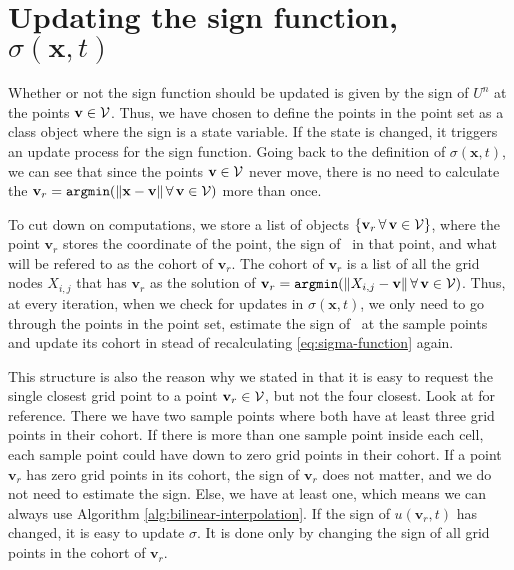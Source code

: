 \section{Updating the sign function, \texorpdfstring{$\sigma (\mathbf{x}, t)$}{sigma}} \label{sec:data-struc}
Whether or not the sign function should be updated is given by the sign of $U^n$ at the points $\mathbf{v}\in\mathcal{V}$. Thus, we have chosen to define the points in the point set as a class object where the sign is a state variable. If the state is changed, it triggers an update process for the sign function. Going back to the definition of $\sigma(\mathbf{x}, t)$, we can see that since the points $\mathbf{v}\in\mathcal{V}$ never move, there is no need to calculate the $\mathbf{v}_r = \texttt{argmin}(\|\mathbf{x}-\mathbf{v}\| \, \forall \, \mathbf{v} \in \mathcal{V})$ more than once. 

To cut down on computations, we store a list of objects $\{\mathbf{v}_r \, \forall \, \mathbf{v} \in \mathcal{V}\}$, where the point $\mathbf{v}_r$ stores the coordinate of the point, the sign of \uxt\ in that point, and what will be refered to as the cohort of $\mathbf{v}_r$. The cohort of $\mathbf{v}_r$ is a list of all the grid nodes $X_{i, j}$ that has $\mathbf{v}_r$ as the solution of $\mathbf{v}_r = \texttt{argmin}(\|X_{i, j}-\mathbf{v}\| \, \forall \, \mathbf{v} \in \mathcal{V})$. Thus, at every iteration, when we check for updates in $\sigma(\mathbf{x}, t)$, we only need to go through the points in the point set, estimate the sign of \uxt\ at the sample points and update its cohort in stead of recalculating \eqref{eq:sigma-function} again.

This structure is also the reason why we stated in  that it is easy to request the single closest grid point to a point $\mathbf{v}_r \in \mathcal{V}$, but not the four closest. Look at  for reference. There we have two sample points where both have at least three grid points in their cohort. If there is more than one sample point inside each cell, each sample point could have down to zero grid points in their cohort. If a point $\mathbf{v}_r$ has zero grid points in its cohort, the sign of $\mathbf{v}_r$ does not matter, and we do not need to estimate the sign. Else, we have at least one, which means we can always use Algorithm \ref{alg:bilinear-interpolation}. If the sign of $u(\mathbf{v}_r, t)$ has changed, it is easy to update $\sigma$. It is done only by changing the sign of all grid points in the cohort of $\mathbf{v}_r$.

